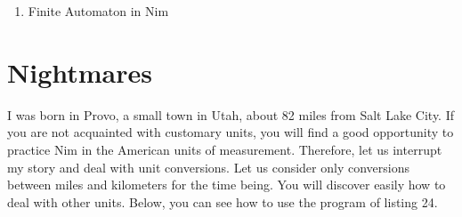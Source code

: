 \documentclass[
  12pt,
]{book}
\newenvironment{Shaded}{}{}
\newcommand{\CommentTok}[1]{\textcolor[rgb]{0.38,0.63,0.69}{\textit{#1}}}
\newcommand{\DataTypeTok}[1]{\textcolor[rgb]{0.56,0.13,0.00}{#1}}
\newcommand{\DecValTok}[1]{\textcolor[rgb]{0.25,0.63,0.44}{#1}}
\newcommand{\FloatTok}[1]{\textcolor[rgb]{0.25,0.63,0.44}{#1}}
\newcommand{\KeywordTok}[1]{\textcolor[rgb]{0.00,0.44,0.13}{\textbf{#1}}}
\newcommand{\NormalTok}[1]{#1}
\newcommand{\OtherTok}[1]{\textcolor[rgb]{0.00,0.44,0.13}{#1}}
\newcommand{\StringTok}[1]{\textcolor[rgb]{0.25,0.44,0.63}{#1}}
\providecommand{\tightlist}{%
  \setlength{\itemsep}{0pt}\setlength{\parskip}{0pt}}
\begin{document}
\begin{Shaded}
\end{Shaded}

\begin{enumerate}
\def\labelenumi{(\arabic{enumi})}
\setcounter{enumi}{22}
\tightlist
\item
  Finite Automaton in Nim
\end{enumerate}

\chapter{Nightmares}\label{nightmares}

I was born in Provo, a small town in Utah, about 82 miles from Salt Lake
City. If you are not acquainted with customary units, you will find a
good opportunity to practice Nim in the American units of measurement.
Therefore, let us interrupt my story and deal with unit conversions. Let
us consider only conversions between miles and kilometers for the time
being. You will discover easily how to deal with other units. Below, you
can see how to use the program of listing 24.
\end{document}
